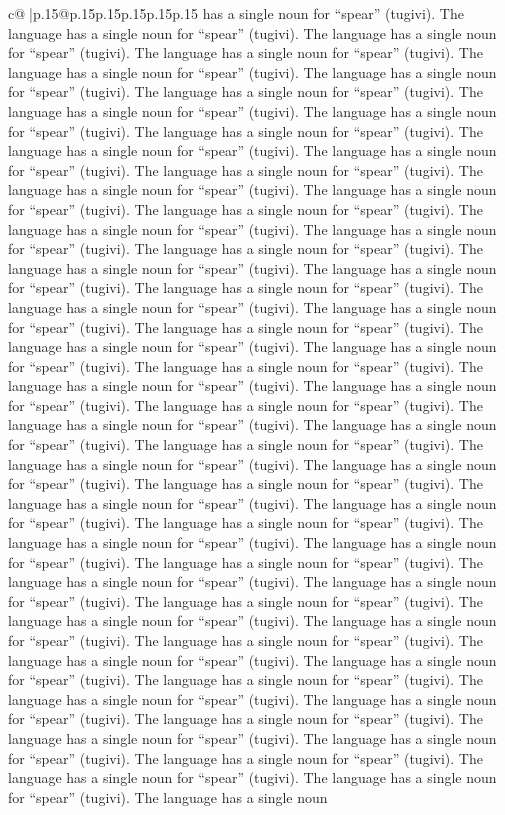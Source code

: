 \documentclass{article}
\begin{document}
{\begin{supertabular}{c@{$\;$}|p{.15\linewidth}@{}p{.15\linewidth}p{.15\linewidth}p{.15\linewidth}p{.15\linewidth}p{.15\linewidth}}
{{{has a single noun for “spear” (tugivi). The language has a single noun for “spear” (tugivi). The language has a single noun for “spear” (tugivi). The language has a single noun for “spear” (tugivi). The language has a single noun for “spear” (tugivi). The language has a single noun for “spear” (tugivi). The language has a single noun for “spear” (tugivi). The language has a single noun for “spear” (tugivi). The language has a single noun for “spear” (tugivi). The language has a single noun for “spear” (tugivi). The language has a single noun for “spear” (tugivi). The language has a single noun for “spear” (tugivi). The language has a single noun for “spear” (tugivi). The language has a single noun for “spear” (tugivi). The language has a single noun for “spear” (tugivi). The language has a single noun for “spear” (tugivi). The language has a single noun for “spear” (tugivi). The language has a single noun for “spear” (tugivi). The language has a single noun for “spear” (tugivi). The language has a single noun for “spear” (tugivi). The language has a single noun for “spear” (tugivi). The language has a single noun for “spear” (tugivi). The language has a single noun for “spear” (tugivi). The language has a single noun for “spear” (tugivi). The language has a single noun for “spear” (tugivi). The language has a single noun for “spear” (tugivi). The language has a single noun for “spear” (tugivi). The language has a single noun for “spear” (tugivi). The language has a single noun for “spear” (tugivi). The language has a single noun for “spear” (tugivi). The language has a single noun for “spear” (tugivi). The language has a single noun for “spear” (tugivi). The language has a single noun for “spear” (tugivi). The language has a single noun for “spear” (tugivi). The language has a single noun for “spear” (tugivi). The language has a single noun for “spear” (tugivi). The language has a single noun for “spear” (tugivi). The language has a single noun for “spear” (tugivi). The language has a single noun for “spear” (tugivi). The language has a single noun for “spear” (tugivi). The language has a single noun for “spear” (tugivi). The language has a single noun for “spear” (tugivi). The language has a single noun for “spear” (tugivi). The language has a single noun for “spear” (tugivi). The language has a single noun for “spear” (tugivi). The language has a single noun for “spear” (tugivi). The language has a single noun for “spear” (tugivi). The language has a single noun for “spear” (tugivi). The language has a single noun for “spear” (tugivi). The language has a single noun for “spear” (tugivi). The language has a single noun for “spear” (tugivi). The language has a single noun for “spear” (tugivi). The language has a single noun for “spear” (tugivi). The language has a single noun for “spear” (tugivi). The language has a single noun for “spear” (tugivi). The language has a single noun for “spear” (tugivi). The language has a single noun for “spear” (tugivi). The language has a single noun for “spear” (tugivi). The language has a single noun for “spear” (tugivi). The language has a single noun for “spear” (tugivi). The language has a single noun }}}
\end{supertabular}}
\end{document}
